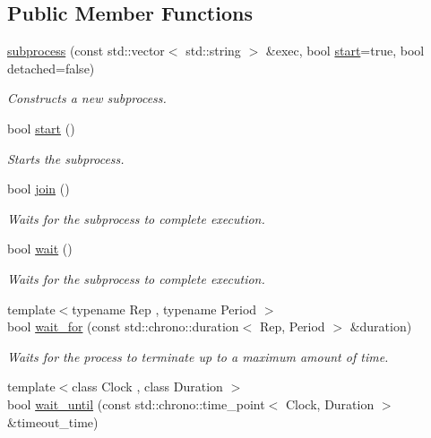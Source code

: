 \subsection*{Public Member Functions}
\begin{DoxyCompactItemize}
\item 
\hyperlink{classcpen333_1_1process_1_1windows_1_1subprocess_ab927ab6d2b499cb7079bc2dedbd670ff}{subprocess} (const std\+::vector$<$ std\+::string $>$ \&exec, bool \hyperlink{classcpen333_1_1process_1_1windows_1_1subprocess_ad6fddf2c148cefff9753dafaeb35d1a3}{start}=true, bool detached=false)
\begin{DoxyCompactList}\small\item\em Constructs a new subprocess. \end{DoxyCompactList}\item 
bool \hyperlink{classcpen333_1_1process_1_1windows_1_1subprocess_ad6fddf2c148cefff9753dafaeb35d1a3}{start} ()
\begin{DoxyCompactList}\small\item\em Starts the subprocess. \end{DoxyCompactList}\item 
bool \hyperlink{classcpen333_1_1process_1_1windows_1_1subprocess_a973a466ad1f7299d1511e4a0628bc3f4}{join} ()
\begin{DoxyCompactList}\small\item\em Waits for the subprocess to complete execution. \end{DoxyCompactList}\item 
bool \hyperlink{classcpen333_1_1process_1_1windows_1_1subprocess_a54fe40167d1bf23bce4195c5aa34ec5f}{wait} ()
\begin{DoxyCompactList}\small\item\em Waits for the subprocess to complete execution. \end{DoxyCompactList}\item 
{\footnotesize template$<$typename Rep , typename Period $>$ }\\bool \hyperlink{classcpen333_1_1process_1_1windows_1_1subprocess_aed7bf88b47dfa88ba8c97d6dbc94c124}{wait\+\_\+for} (const std\+::chrono\+::duration$<$ Rep, Period $>$ \&duration)
\begin{DoxyCompactList}\small\item\em Waits for the process to terminate up to a maximum amount of time. \end{DoxyCompactList}\item 
{\footnotesize template$<$class Clock , class Duration $>$ }\\bool \hyperlink{classcpen333_1_1process_1_1windows_1_1subprocess_a228f617ee1ef52374041d6dd094105ba}{wait\+\_\+until} (const std\+::chrono\+::time\+\_\+point$<$ Clock, Duration $>$ \&timeout\+\_\+time)

\end{DoxyCompactItemize}
